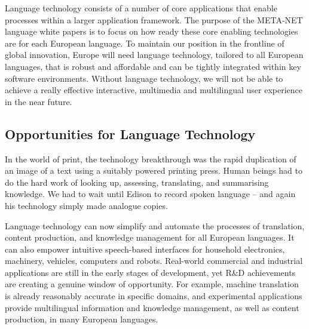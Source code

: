 \begin{multicols}{2}
Language technology consists of a number of core applications that enable processes within a larger application framework. The purpose of the META-NET language white papers is to focus on how ready these core enabling technologies are for each European language. 
To maintain our position in the frontline of global innovation, Europe will need language technology, tailored to all European languages, that is robust and affordable and can be tightly integrated within key software environments. Without language technology, we will not be able to achieve a really effective interactive, multimedia and multilingual user experience in the near future.

\subsection{Opportunities for Language Technology}

In the world of print, the technology breakthrough was the rapid duplication of an image of a text using a suitably powered printing press. Human beings had to do the hard work of looking up, assessing, translating, and summarising knowledge. We had to wait until Edison to record spoken language -- and again his technology simply made analogue copies.

Language technology can now simplify and automate the processes of translation, content production, and knowledge management for all European languages. It can also empower intuitive speech-based interfaces for household electronics, machinery, vehicles, computers and robots. Real-world commercial and industrial applications are still in the early stages of development, yet R\&D achievements are creating a genuine window of opportunity. For example, machine translation is already reasonably accurate in specific domains, and experimental applications provide multilingual information and knowledge management, as well as content production, in many European languages. 


\end{multicols}
